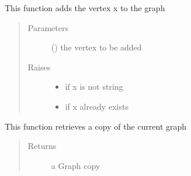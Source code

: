 \documentclass[letterpaper,10pt,english]{sphinxmanual}
\begin{document}
\begin{fulllineitems}
\begin{fulllineitems}
\begin{quote}
\begin{description}
\end{description}\end{quote}

\end{fulllineitems}


\begin{fulllineitems}
\label{\detokenize{UndirectedGraph:UndirectedGraph.UndirectedGraph.add_vertex}}
This function adds the vertex x to the graph
\begin{quote}\begin{description}
\item[{Parameters}] \leavevmode
{} () \textendash{} the vertex to be added

\item[{Raises}] \leavevmode\begin{itemize}
\item {} 
 \textendash{} if x is not string

\item {} 
 \textendash{} if x already exists

\end{itemize}

\end{description}\end{quote}

\end{fulllineitems}


\begin{fulllineitems}
\label{\detokenize{UndirectedGraph:UndirectedGraph.UndirectedGraph.copy}}
This function retrieves a copy of the current graph
\begin{quote}\begin{description}
\item[{Returns}] \leavevmode
a Graph copy

\end{description}\end{quote}


\end{fulllineitems}
\end{fulllineitems}
\end{document}
